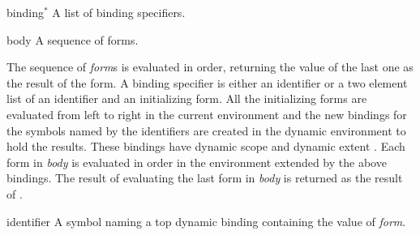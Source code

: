 \begin{optDefinition}
%
\Syntax
{}%
%
\begin{arguments}
    \item[binding\/$^*$] A list of binding specifiers.

    \item[body] A sequence of forms.
\end{arguments}
%
\result%
The sequence of {\em form}s is evaluated in order, returning the value of the
last one as the result of the  form.
%
\remarks%
A binding specifier is either an identifier or a two element list of an
identifier and an initializing form.  All the initializing forms are evaluated
from left to right in the current environment and the new bindings for the
symbols named by the identifiers are created in the dynamic environment to hold
the results.  These bindings have dynamic scope and dynamic extent
.  Each
form in {\em body} is evaluated in order in the environment extended by the
above bindings.  The result of evaluating the last form in {\em body} is
returned as the result of .

%
\Syntax
{}%
%
\begin{arguments}
    \item[identifier] A symbol naming a top dynamic binding containing the value
    of {\em form}.


\end{arguments}
\end{optDefinition}
